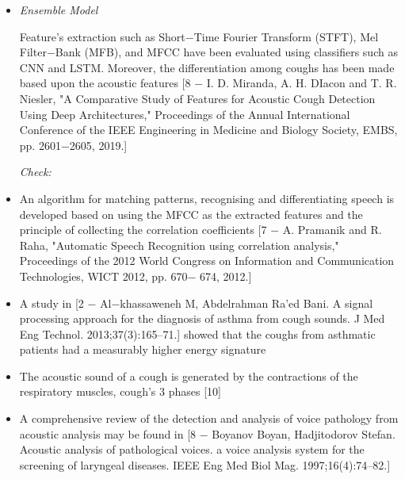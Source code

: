 \documentclass[11pt]{article}
\begin{document}
\begin{itemize}
\vspace{1\baselineskip}
	\item {\Large \textit{Ensemble Model}}

\vspace{31\baselineskip}
Feature's extraction such as Short$-$Time Fourier Transform (STFT), Mel Filter$-$Bank (MFB), and MFCC have been evaluated using classifiers such as CNN and LSTM. Moreover, the differentiation among coughs has been made based upon the acoustic features [8  $-$ I. D. Miranda, A. H. DIacon and T. R. Niesler, "A Comparative Study of Features for Acoustic Cough Detection Using Deep Architectures," Proceedings of the Annual International Conference of the IEEE Engineering in Medicine and Biology Society, EMBS, pp. 2601$-$2605, 2019.]

\vspace{2\baselineskip}
\textit{Check:}

\vspace{1\baselineskip}
	\item An algorithm for matching patterns, recognising and differentiating speech is developed based on using the MFCC as the extracted features and the principle of collecting the correlation coefficients [7 $-$ A. Pramanik and R. Raha, "Automatic Speech Recognition using correlation analysis," Proceedings of the 2012 World Congress on Information and Communication Technologies, WICT 2012, pp. 670$-$ 674, 2012.]

\vspace{1\baselineskip}
	\item A study in [2 $-$ Al$-$khassaweneh M, Abdelrahman Ra’ed Bani. A signal processing approach for the diagnosis of asthma from cough sounds. J Med Eng Technol. 2013;37(3):165–71.] showed that the coughs from asthmatic patients had a measurably higher energy signature

\vspace{1\baselineskip}
	\item The acoustic sound of a cough is generated by the contractions of the respiratory muscles, cough's 3 phases [10]

\vspace{1\baselineskip}
	\item A comprehensive review of the detection and analysis of voice pathology from acoustic analysis may be found in [8 $-$ Boyanov Boyan, Hadjitodorov Stefan. Acoustic analysis of pathological voices. a voice analysis system for the screening of laryngeal diseases. IEEE Eng Med Biol Mag. 1997;16(4):74–82.]


\end{itemize}
\end{document}
